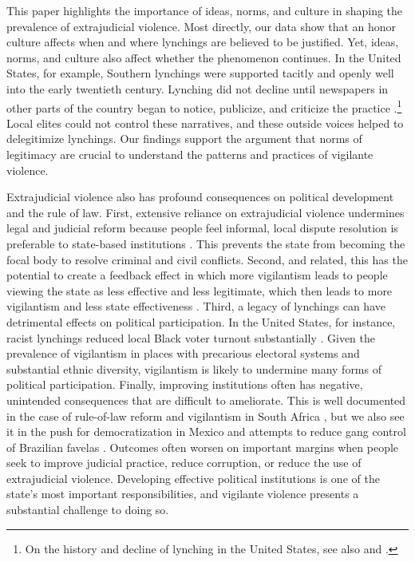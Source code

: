 \documentclass[12pt,ansiapaper]{article}
\begin{document}
This paper highlights the importance of ideas, norms, and culture in shaping the prevalence of extrajudicial violence. Most directly, our data show that an honor culture affects when and where lynchings are believed to be justified. Yet, ideas, norms, and culture also affect whether the phenomenon continues. In the United States, for example, Southern lynchings were supported tacitly and openly well into the early twentieth century. Lynching did not decline until newspapers in other parts of the country began to notice, publicize, and criticize the practice \citep{weaver2019judge}.\footnote{On the history and decline of lynching in the United States, see also \citet{wood2011lynching} and \citet{rushdy2012american}.} Local elites could not control these narratives, and these outside voices helped to delegitimize lynchings. Our findings support the argument that norms of legitimacy are crucial to understand the patterns and practices of vigilante violence.

Extrajudicial violence also has profound consequences on political development and the rule of law. First, extensive reliance on extrajudicial violence undermines legal and judicial reform because people feel informal, local dispute resolution is preferable to state-based institutions \citep{blair2020peacekeeping}. This prevents the state from becoming the focal body to resolve criminal and civil conflicts. Second, and related, this has the potential to create a feedback effect in which more vigilantism leads to people viewing the state as less effective and less legitimate, which then leads to more vigilantism and less state effectiveness \citep{jung2020lynching}. Third, a legacy of lynchings can have detrimental effects on political participation. In the United States, for instance, racist lynchings reduced local Black voter turnout substantially \citep{jones2017political}. Given the prevalence of vigilantism in places with precarious electoral systems and substantial ethnic diversity, vigilantism is likely to undermine many forms of political participation. Finally, improving institutions often has negative, unintended consequences that are difficult to ameliorate. This is well documented in the case of rule-of-law reform and vigilantism in South Africa \citep{smith2019contradictions}, but we also see it in the push for democratization in Mexico \citep{trejo2021high} and attempts to reduce gang control of Brazilian favelas \citep{magaloni2020killing}. Outcomes often worsen on important margins when people seek to improve judicial practice, reduce corruption, or reduce the use of extrajudicial violence. 
Developing effective political institutions is one of the state's most important responsibilities, and vigilante violence presents a substantial challenge to doing so. 

\newpage

\setlength{\parindent}{0cm}
\setlength{\parskip}{5pt}


\end{document}
